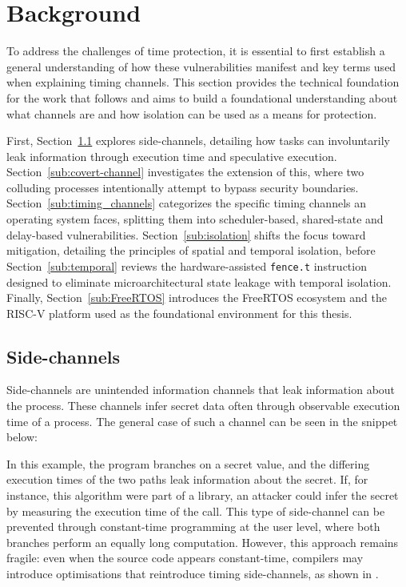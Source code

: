 \section{Background}\label{sec:Background}
To address the challenges of time protection, it is essential to first
establish a general understanding of how these vulnerabilities manifest and key
terms used when explaining timing channels. This section provides the technical
foundation for the work that follows and aims to build a foundational
understanding about what channels are and how isolation can be used as a means
for protection.

First, Section~\ref{sub:side-channel} explores side-channels, detailing how
tasks can involuntarily leak information through execution time and
speculative execution. Section~\ref{sub:covert-channel} investigates the
extension of this, where two colluding processes intentionally attempt to
bypass security boundaries. Section~\ref{sub:timing_channels} categorizes the
specific timing channels an operating system faces, splitting them into
scheduler-based, shared-state and delay-based vulnerabilities.
Section~\ref{sub:isolation} shifts the focus toward mitigation, detailing the
principles of spatial and temporal isolation, before
Section~\ref{sub:temporal} reviews the hardware-assisted \texttt{fence.t}
instruction designed to eliminate microarchitectural state leakage with
temporal isolation. Finally, Section~\ref{sub:FreeRTOS} introduces the
FreeRTOS ecosystem and the RISC-V platform used as the foundational
environment for this thesis.

\subsection{Side-channels}\label{sub:side-channel}
Side-channels are unintended information channels that leak information about
the process. These channels infer secret data often through observable
execution time of a process. The general case of such a channel can be seen
in the snippet below:

\begin{algorithm}[H]
  \begin{algorithmic}[1]
    \Else
    \EndIf
  \end{algorithmic}
\end{algorithm}

In this example, the program branches on a secret value, and the differing
execution times of the two paths leak information about the secret. If, for
instance, this algorithm were part of a library, an attacker could infer the
secret by measuring the execution time of the call. This type of side-channel
can be prevented through constant-time programming at the user level, where
both branches perform an equally long computation. However, this approach
remains fragile: even when the source code appears constant-time, compilers may
introduce optimisations that reintroduce timing side-channels, as shown in
\cite{schneider2025}.

